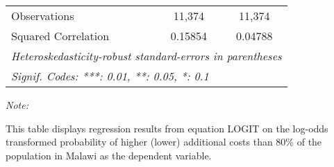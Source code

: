\begin{table}[htbp!]
\begin{adjustbox}{width = 1\textwidth, max height = 0.95\textheight, center}
\begin{threeparttable}[b]
\begin{tabular}{lcc}
            Observations          & 11,374         & 11,374\\  
            Squared Correlation   & 0.15854        & 0.04788\\  
            \midrule \midrule
            \multicolumn{3}{l}{\emph{Heteroskedasticity-robust standard-errors in parentheses}}\\
            \multicolumn{3}{l}{\emph{Signif. Codes: ***: 0.01, **: 0.05, *: 0.1}}\\
         \end{tabular}
         
         \begin{tablenotes}\item \medskip \textit{Note:}
            \item This table displays regression results from equation LOGIT on the log-odds transformed probability of higher (lower) additional costs than 80\% of the population in Malawi as the dependent variable. 
         \end{tablenotes}
      \end{threeparttable}
   \end{adjustbox}
\end{table}


